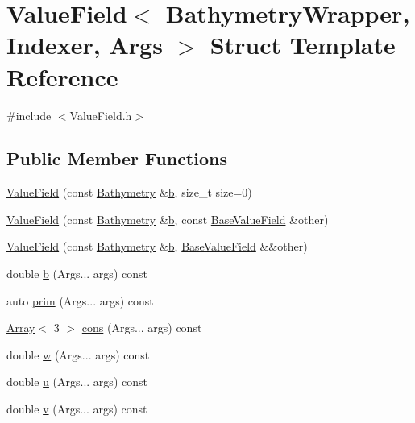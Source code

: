 \hypertarget{structValueField}{}\section{Value\+Field$<$ Bathymetry\+Wrapper, Indexer, Args $>$ Struct Template Reference}
\label{structValueField}


{\ttfamily \#include $<$Value\+Field.\+h$>$}

\subsection*{Public Member Functions}
\begin{DoxyCompactItemize}
\item 
\hyperlink{structValueField_a2521410c5bbd0823c479ddf97aa6f9ad}{Value\+Field} (const \hyperlink{structBathymetry}{Bathymetry} \&\hyperlink{structValueField_a33f345a79bcb21fee59cd56de29cd901}{b}, size\+\_\+t size=0)
\item 
\hyperlink{structValueField_a06fd34216812e1b62965b87358e57708}{Value\+Field} (const \hyperlink{structBathymetry}{Bathymetry} \&\hyperlink{structValueField_a33f345a79bcb21fee59cd56de29cd901}{b}, const \hyperlink{structBaseValueField}{Base\+Value\+Field} \&other)
\item 
\hyperlink{structValueField_aacd76ae7d4471b4f2e21a69e5c09fe8d}{Value\+Field} (const \hyperlink{structBathymetry}{Bathymetry} \&\hyperlink{structValueField_a33f345a79bcb21fee59cd56de29cd901}{b}, \hyperlink{structBaseValueField}{Base\+Value\+Field} \&\&other)
\item 
double \hyperlink{structValueField_a33f345a79bcb21fee59cd56de29cd901}{b} (Args... args) const
\item 
auto \hyperlink{structValueField_a62a3819a67553452878a8925354b5631}{prim} (Args... args) const
\item 
\hyperlink{Includes_8h_abd9de33944f934950000c3929e14ad8d}{Array}$<$ 3 $>$ \hyperlink{structValueField_acb7a0272b71871ba858e9862d64ba8c7}{cons} (Args... args) const
\item 
double \hyperlink{structValueField_a5ea42e809989b2b1a5a84683172ab659}{w} (Args... args) const
\item 
double \hyperlink{structValueField_a7a94024fc87e8f52448f7bc3d0b4274b}{u} (Args... args) const
\item 
double \hyperlink{structValueField_a390be8818fdf0bb7892f8e71a686fa2f}{v} (Args... args) const

\end{DoxyCompactItemize}
